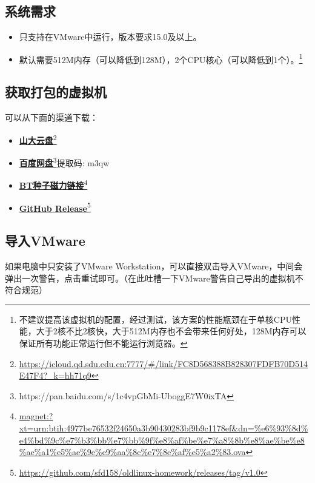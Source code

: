 \documentclass[]{report}
\begin{document}
\subsection{系统需求}
\begin{itemize}
    \item 只支持在VMware中运行，版本要求15.0及以上。
    \item 默认需要512M内存（可以降低到128M），2个CPU核心（可以降低到1个）。\footnote{不建议提高该虚拟机的配置，经过测试，该方案的性能瓶颈在于单核CPU性能，大于2核不比2核快，大于512M内存也不会带来任何好处，128M内存可以保证所有功能正常运行但不能运行浏览器。}
\end{itemize}

\subsection{获取打包的虚拟机}

可以从下面的渠道下载：
\begin{itemize}
    \item  \href{https://icloud.qd.sdu.edu.cn:7777/#/link/FC8D568388B828307FDFB70D514E47F4?_k=hh71q9}{\textbf{山大云盘}}\footnote{\url{https://icloud.qd.sdu.edu.cn:7777/\#/link/FC8D568388B828307FDFB70D514E47F4?\_k=hh71q9}}
    \item \href{https://pan.baidu.com/s/1c4vpGbMi-UboggE7W0ixTA}{\textbf{百度网盘}\footnote{\url{https://pan.baidu.com/s/1c4vpGbMi-UboggE7W0ixTA}}\quad 提取码: m3qw}
    \item \href{magnet:?xt=urn:btih:4977be76532f24650a3b90430283bf9b9c1178ef&dn=%e6%93%8d%e4%bd%9c%e7%b3%bb%e7%bb%9f%e8%af%be%e7%a8%8b%e8%ae%be%e8%ae%a1%e5%ae%9e%e9%aa%8c%e7%8e%af%e5%a2%83.ova}{\textbf{BT种子磁力链接}}\footnote{\url{magnet:?xt=urn:btih:4977be76532f24650a3b90430283bf9b9c1178ef&dn=\%e6\%93\%8d\%e4\%bd\%9c\%e7\%b3\%bb\%e7\%bb\%9f\%e8\%af\%be\%e7\%a8\%8b\%e8\%ae\%be\%e8\%ae\%a1\%e5\%ae\%9e\%e9\%aa\%8c\%e7\%8e\%af\%e5\%a2\%83.ova}}
    \item \href{https://github.com/sfd158/oldlinux-homework/releases/tag/v1.0}{\textbf{GitHub Release}}\footnote{\url{https://github.com/sfd158/oldlinux-homework/releases/tag/v1.0}}
\end{itemize}

\subsection{导入VMware}

如果电脑中只安装了VMware Workstation，可以直接双击导入VMware，中间会弹出一次警告，点击重试即可。（在此吐槽一下VMware警告自己导出的虚拟机不符合规范）
\end{document}
